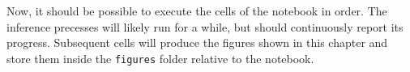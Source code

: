 \begin{tcolorbox}[title=\faIcon{recycle} Reproducibility, parbox=false]
    Now, it should be possible to execute the cells of the notebook in order. The inference precesses will likely run for a while, but should continuously report its progress. Subsequent cells will produce the figures shown in this chapter and store them inside the  \texttt{figures} folder relative to the notebook.
\end{tcolorbox}
